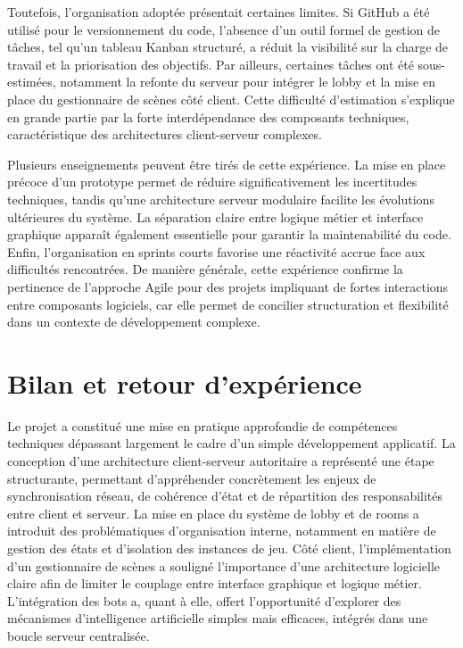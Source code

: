 \documentclass[a4paper, 11pt]{article}
\begin{document}
Toutefois, l’organisation adoptée présentait certaines limites. Si GitHub a été utilisé pour le versionnement du code, l’absence d’un outil formel de gestion de tâches, tel qu’un tableau Kanban structuré, a réduit la visibilité sur la charge de travail et la priorisation des objectifs. Par ailleurs, certaines tâches ont été sous-estimées, notamment la refonte du serveur pour intégrer le lobby et la mise en place du gestionnaire de scènes côté client. Cette difficulté d’estimation s’explique en grande partie par la forte interdépendance des composants techniques, caractéristique des architectures client-serveur complexes.

Plusieurs enseignements peuvent être tirés de cette expérience. La mise en place précoce d’un prototype permet de réduire significativement les incertitudes techniques, tandis qu’une architecture serveur modulaire facilite les évolutions ultérieures du système. La séparation claire entre logique métier et interface graphique apparaît également essentielle pour garantir la maintenabilité du code. Enfin, l’organisation en sprints courts favorise une réactivité accrue face aux difficultés rencontrées. De manière générale, cette expérience confirme la pertinence de l’approche Agile pour des projets impliquant de fortes interactions entre composants logiciels, car elle permet de concilier structuration et flexibilité dans un contexte de développement complexe.

\section{Bilan et retour d’expérience}

Le projet a constitué une mise en pratique approfondie de compétences techniques dépassant largement le cadre d’un simple développement applicatif. La conception d’une architecture client-serveur autoritaire a représenté une étape structurante, permettant d’appréhender concrètement les enjeux de synchronisation réseau, de cohérence d’état et de répartition des responsabilités entre client et serveur. La mise en place du système de lobby et de rooms a introduit des problématiques d’organisation interne, notamment en matière de gestion des états et d’isolation des instances de jeu. Côté client, l’implémentation d’un gestionnaire de scènes a souligné l’importance d’une architecture logicielle claire afin de limiter le couplage entre interface graphique et logique métier. L’intégration des bots a, quant à elle, offert l’opportunité d’explorer des mécanismes d’intelligence artificielle simples mais efficaces, intégrés dans une boucle serveur centralisée.
\end{document}
